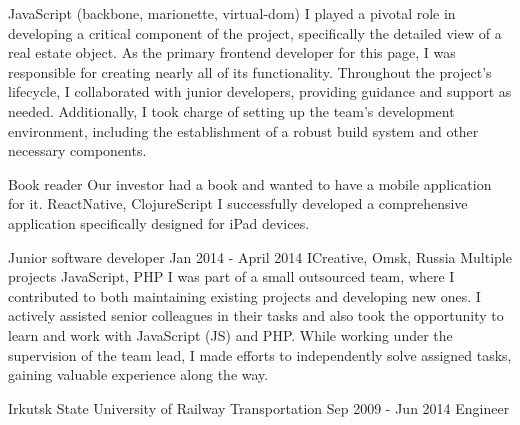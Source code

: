 \documentclass[11pt,a4paper,sans]{awesomecv}
\begin{document}
\begin{cventries}
{\begin{cvprojects}{0.8ex}
            {JavaScript (backbone, marionette, virtual-dom)}
            {
              I played a pivotal role in developing a critical component 
              of the project, specifically the detailed view of a real estate 
              object. As the primary frontend developer for this page, I was 
              responsible for creating nearly all of its functionality. 
              Throughout the project's lifecycle, I collaborated with junior developers, 
              providing guidance and support as needed. 
              Additionally, I took charge of setting up the team's development environment, 
              including the establishment of a robust build system and other necessary components.
            }
        \item \cvproject
            {Book reader}
            {}
            {Our investor had a book and wanted to have a mobile application for it.}
            {ReactNative, ClojureScript}
            {I successfully developed a comprehensive application specifically designed for iPad devices.}
      \end{cvprojects}
    }
\cventry
    {Junior software developer}
    {Jan 2014 - April 2014}
    {ICreative, Omsk, Russia}{}
    {
      Multiple projects\newline
      \vspace{0.8ex}
      \cvproject
          {}{}{}
          {JavaScript, PHP}
          {
            I was part of a small outsourced team, 
            where I contributed to both maintaining 
            existing projects and developing new ones. 
            I actively assisted senior colleagues in their tasks 
            and also took the opportunity to learn and work with 
            JavaScript (JS) and PHP. While working under the supervision 
            of the team lead, I made efforts to independently solve 
            assigned tasks, gaining valuable experience along the way.
          }
    }
\end{cventries}

\begin{cventries}
\cventry
    {Irkutsk State University of Railway Transportation}
    {Sep 2009 - Jun 2014}
    {Engineer}
    {}
    {}
\end{cventries}
\end{document}
